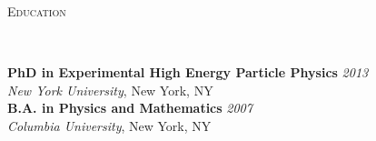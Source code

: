 \documentclass[9pt]{article}
\newenvironment{changemargin}[2]{%
  \begin{list}{}{%
    \setlength{\topsep}{0pt}%
    \setlength{\leftmargin}{#1}%
    \setlength{\rightmargin}{#2}%
    \setlength{\listparindent}{\parindent}%
    \setlength{\itemindent}{\parindent}%
    \setlength{\parsep}{\parskip}%
  }%
  \item[]}{\end{list}
}
\newcommand{\lineover}{
	\begin{changemargin}{-0.05in}{-0.05in}
		\vspace*{-8pt}
		\hrulefill \\
		\vspace*{-2pt}
	\end{changemargin}
}
\newcommand{\header}[1]{
	\begin{changemargin}{-0.5in}{-0.5in}
		\scshape{#1}\\
  	\lineover
	\end{changemargin}
}
\newenvironment{body} {
	\vspace*{-16pt}
	\begin{changemargin}{-0.25in}{-0.5in}
  }	
	{\end{changemargin}
}
\begin{document}
\smallskip

\header{Education}

\begin{body}
	\vspace{14pt}
	\textbf{PhD in Experimental High Energy Particle Physics }{} \hfill \emph{2013}{} \\
	\emph{New York University}, New York, NY{} \\
  \medskip
	\textbf{B.A. in Physics and Mathematics} \hfill \emph{2007} \\
	\emph{Columbia University}, New York, NY\\
\end{body}
\end{document}
